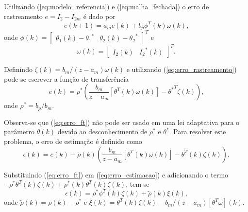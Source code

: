   Utilizando (\ref{eq:modelo_referencia}) e (\ref{eq:malha_fechada}) o erro de rastreamento $e = I_2 - I_{2m}$ é dado por
  \begin{equation}
    e (k+1) = a_m e(k) + b_p \phi^T (k) \omega (k) \text{,}
    \label{eq:erro_rastreamento}
  \end{equation}
  onde $\phi (k) = {\left[ \begin{matrix} \theta_1 (k) - {\theta_1}^* & \theta_2 (k) - {\theta_2}^*
  \end{matrix} \right]}^T$ e
  \begin{equation}
    \omega (k) = {\left[ \begin{matrix} I_2 (k) & {I_2}^* (k) \end{matrix} \right]}^T \text{.}
    \label{eq:omega_k}
  \end{equation}

  Definindo $\zeta (k) = b_m / (z - a_m) \omega (k)$ e utilizando (\ref{eq:erro_rastreamento}) pode-se escrever a função de transferência
  \begin{equation}
    e(k) = \rho^* \left( \frac{b_m}{z - a_m} \left[ \theta^T (k) \omega (k) \right]
      - {\theta^*}^T \zeta (k) \right) \text{,}
    \label{eq:erro_ft}
  \end{equation}
  onde $\rho^* = b_p / b_m$.

  Observa-se que (\ref{eq:erro_ft}) não pode ser usado em uma lei adaptativa para o parâmetro $\theta (k)$ devido ao desconhecimento de $\rho^*$ e $\theta^*$. Para resolver este problema, o erro de estimação é definido como
  \begin{equation}
    \epsilon (k) = e (k) - \rho(k) \left( \frac{b_m}{z - a_m} \left[ \theta^T (k) \omega(k)
      \right] - \theta^T (k) \zeta(k) \right) \text{.}
    \label{eq:erro_estimacao}
  \end{equation}

  Substituindo (\ref{eq:erro_ft}) em (\ref{eq:erro_estimacao}) e adicionando o termo $-\rho^* \theta^T (k) \zeta (k) + \rho^* (k) \theta^T (k) \zeta(k)$, tem-se
  \begin{equation}
    \epsilon(k) = \rho^* \phi^T(k) \zeta(k) + \tilde{\rho}(k) \xi(k) \text{,}
    \label{eq:epsilon_k}
  \end{equation}
  onde $\tilde{\rho}(k) = \rho(k) - \rho^*$ e $\xi(k) = \theta^T(k) \zeta(k) - b_m / (z - a_m)[\theta^T \omega](k)$.

